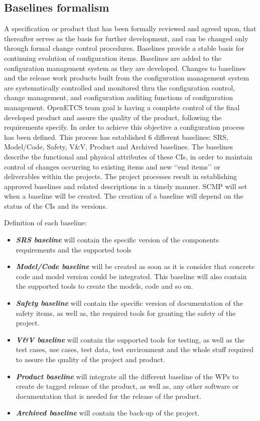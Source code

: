 \documentclass{template/openetcs_article}
\begin{document}
\subsection{Baselines formalism} %
A specification or product that has been formally reviewed and agreed upon, that thereafter serves as the basis for further  development, and can be changed only through formal change control procedures. Baselines provide a stable basis for  continuing evolution of configuration items. Baselines are added to the configuration management system as they are  developed. Changes to baselines and the release work products built from the configuration management system are  systematically controlled and monitored thru the configuration control, change management, and configuration auditing  functions of configuration management. 
OpenETCS team goal is having a complete control of the final developed product and assure the quality of the product,  following the requirements specify. In order to achieve this objective a configuration process has been defined. This process  has established 6 different baselines: SRS, Model/Code, Safety, V\&V, Product and Archived baselines. The baselines describe  the functional and physical attributes of these CIs, in order to maintain control of changes occurring to existing items and new  ‘‘end items’’ or deliverables within the projects. The project processes result in establishing approved baselines and related  descriptions in a timely manner. 
SCMP will set when a baseline will be created. The creation of a baseline will depend on the status of the CIs and its versions.

Definition of each baseline:

\vspace{-10pt}
\begin{itemize}
\item \textbf{\textit{SRS baseline}} will contain the specific version of the components requirements and the supported tools
\item \textbf{\textit{Model/Code baseline}} will be created as soon as it is consider that concrete code and model version could be integrated.  This baseline will also contain the supported tools to create the models, code and so on.
\item \textbf{\textit{Safety baseline}} will contain the specific version of documentation of the safety items, as well as, the required tools for granting the safety of the project.
\item \textbf{\textit{V\&V baseline}} will contain the supported tools for testing, as well as the test cases, use cases, test data, test environment and the whole stuff required to assure the quality of the project and product.
\item \textbf{\textit{Product baseline}} will integrate all the different baseline of the WPs to create de tagged release of the product, as well as, any other software or documentation that is needed for the release of the product.
\item \textbf{\textit{Archived baseline}} will contain the back-up of the project.
\end{itemize}
\end{document}
